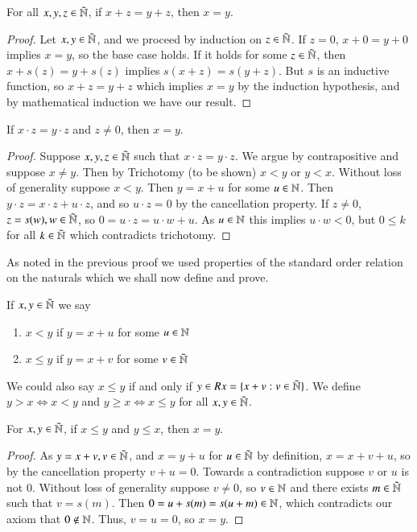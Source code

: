 \begin{prop}\label{prop:1.1.11}
    For all $x,y,z \in \tilde{\mathbb N}$, if $x+z = y+z$, then $x = y$.
\end{prop}
\begin{proof}
    Let $x,y \in \tilde{\mathbb N}$, and we proceed by induction on $z \in \tilde{\mathbb N}$. If $z = 0$, $x+0 = y+0$ implies $x = y$, so the base case holds. If it holds for some $z \in \tilde{\mathbb N}$, then $x+s(z) = y+s(z)$ implies $s(x+z) = s(y+z)$. But $s$ is an inductive function, so $x +z = y+z$ which implies $x = y$ by the induction hypothesis, and by mathematical induction we have our result.
\end{proof}

\begin{prop}\label{prop:1.1.12}
    If $x \cdot z = y \cdot z$ and $z \neq 0$, then $x =y$.
\end{prop}
\begin{proof}
    Suppose $x,y,z \in \tilde{\mathbb N}$ such that $x\cdot z = y\cdot z$. We argue by contrapositive and suppose $x \neq y$. Then by Trichotomy (to be shown) $x < y$ or $y < x$. Without loss of generality suppose $x < y$. Then $y = x+u$ for some $u \in \mathbb N$. Then $y\cdot z = x\cdot z + u\cdot z$, and so $u\cdot z = 0$ by the cancellation property. If $z \neq 0$, $z = s(w), w \in \tilde{\mathbb N}$, so $0 = u\cdot z = u\cdot w + u$. As $u \in \mathbb N$ this implies $u\cdot w < 0$, but $0 \leq k$ for all $k \in \tilde{\mathbb N}$ which contradicts trichotomy.
\end{proof}

As noted in the previous proof we used properties of the standard order relation on the naturals which we shall now define and prove.

\begin{defn}
    If $x,y \in \tilde{\mathbb N}$ we say \begin{enumerate}
        \item $x < y$ if $y = x+u$ for some $u \in \mathbb N$
        \item $x \leq y$ if $y = x+v$ for some $v \in \tilde{\mathbb N}$
    \end{enumerate}
\end{defn}

We could also say $x \leq y$ if and only if $y \in Rx = \{x+v:v \in \tilde{\mathbb N}\}$.  We define $y > x \iff x < y$ and $y \geq x \iff x \leq y$ for all $x,y \in \tilde{\mathbb N}$.

\begin{prop}\label{prop:1.1.13}
    For $x,y \in \tilde{\mathbb N}$, if $x \leq y$ and $y \leq x$, then $x =y$.
\end{prop}
\begin{proof}
    As $y = x+v, v \in \tilde{\mathbb N}$, and $x = y+u$ for $u \in \tilde{\mathbb N}$ by definition, $x = x+v+u$, so by the cancellation property $v + u = 0$. Towards a contradiction suppose $v$ or $u$ is not $0$. Without loss of generality suppose $v \neq 0$, so $v \in \mathbb N$ and there exists $m \in \tilde{\mathbb N}$ such that $v = s(m)$. Then $0 = u+s(m) = s(u+m) \in \mathbb N$, which contradicts our axiom that $0 \notin \mathbb N$. Thus, $v = u = 0$, so $x = y$.
\end{proof}

